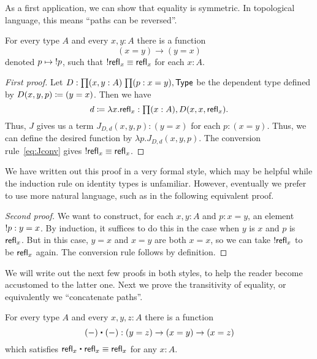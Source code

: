 As a first application, we can show that equality is symmetric.
In topological language, this means ``paths can be reversed''.

\begin{lem}\label{lem:opp}
  For every type $A$ and every $x,y:A$ there is a function
  \begin{equation*}
    (x= y)\to(y= x)
  \end{equation*}
  denoted $p\mapsto \mathord{!{p}}$, such that $\mathord{!{\mathsf{refl}_{x}}}\equiv\mathsf{refl}_{x}$ for each $x:A$.
\end{lem}
\begin{proof}[First proof]
  Let $D:\prd{x,y:A}{p:x= y} \type$ be the dependent type defined by $D(x,y,p)\coloneqq (y= x)$.
  Then we have
  \begin{equation*}
    d\defeq \lambda x.\refl{x}:\prd{x:A} D(x,x,\refl{x}).
  \end{equation*}
  Thus, $J$ gives us a term $J_{D,d}(x,y,p): (y= x)$ for each $p:(x= y)$.
  Thus, we can define the desired function by $\lambda p. J_{D,d}(x,y,p)$.
  The conversion rule~\eqref{eq:Jconv} gives $\mathord{!{\mathsf{refl}_{x}}}\equiv \mathsf{refl}_{x}$.
\end{proof}

We have written out this proof in a very formal style, which may be helpful while the induction rule on identity types is unfamiliar.
However, eventually we prefer to use more natural language, such as in the following equivalent proof.

\begin{proof}[Second proof]
  We want to construct, for each $x,y:A$ and $p:x=y$, an element $\mathord{!{p}}:y=x$.
  By induction, it suffices to do this in the case when $y$ is $x$ and $p$ is $\mathsf{refl}_{x}$.
  But in this case, $y=x$ and $x=y$ are both $x=x$, so we can take $\mathord{!{\mathsf{refl}_{x}}}$ to be $\mathsf{refl}_{x}$ again.
  The conversion rule follows by definition.
\end{proof}

We will write out the next few proofs in both styles, to help the reader become accustomed to the latter one.
Next we prove the transitivity of equality, or equivalently we ``concatenate paths''.

\begin{lem}\label{lem:concat}
  For every type $A$ and every $x,y,z:A$ there is a function
  \begin{equation*}
    {(-)}\ct{(-)}:(y= z)\to (x= y)\to (x=  z)
  \end{equation*}
  which satisfies $\refl{x}\ct \refl{x}\jdeq \refl{x}$ for any $x:A$.
\end{lem}

